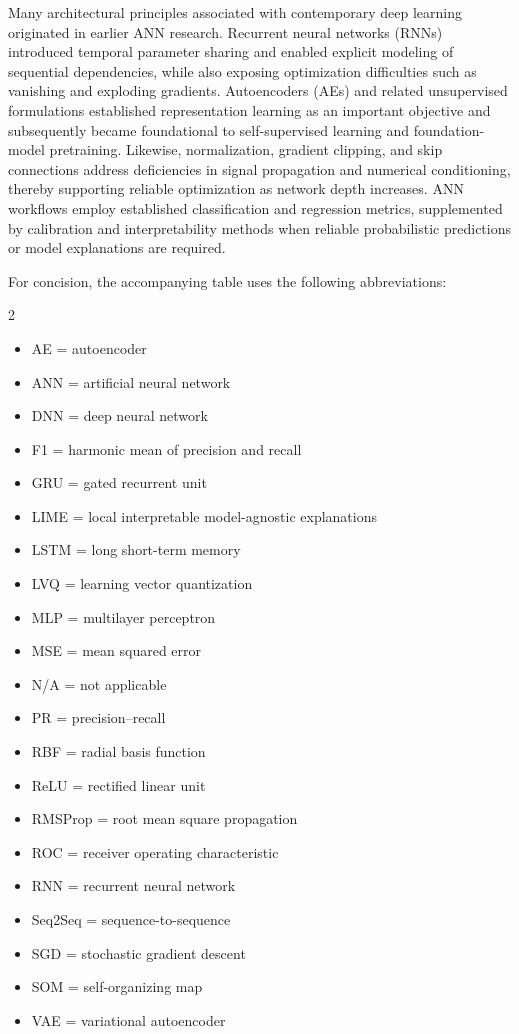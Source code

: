 \documentclass{article}
\begin{document}
Many architectural principles associated with contemporary deep learning originated in earlier ANN research. Recurrent neural networks (RNNs) introduced temporal parameter sharing and enabled explicit modeling of sequential dependencies, while also exposing optimization difficulties such as vanishing and exploding gradients. Autoencoders (AEs) and related unsupervised formulations established representation learning as an important objective and subsequently became foundational to self-supervised learning and foundation-model pretraining. Likewise, normalization, gradient clipping, and skip connections address deficiencies in signal propagation and numerical conditioning, thereby supporting reliable optimization as network depth increases. ANN workflows employ established classification and regression metrics, supplemented by calibration and interpretability methods when reliable probabilistic predictions or model explanations are required.

For concision, the accompanying table uses the following abbreviations:

\begin{multicols}{2}
    \begin{itemize}\setlength{\itemsep}{0cm}
        \item AE = autoencoder
        \item ANN = artificial neural network
        \item DNN = deep neural network
        \item F1 = harmonic mean of precision and recall
        \item GRU = gated recurrent unit
        \item LIME = local interpretable model-agnostic explanations
        \item LSTM = long short-term memory
        \item LVQ = learning vector quantization
        \item MLP = multilayer perceptron
        \item MSE = mean squared error
        \item N/A = not applicable
        \item PR = precision--recall
        \item RBF = radial basis function
        \item ReLU = rectified linear unit
        \item RMSProp = root mean square propagation
        \item ROC = receiver operating characteristic
        \item RNN = recurrent neural network
        \item Seq2Seq = sequence-to-sequence
        \item SGD = stochastic gradient descent
        \item SOM = self-organizing map
        \item VAE = variational autoencoder
    \end{itemize}
\end{multicols}
\end{document}
